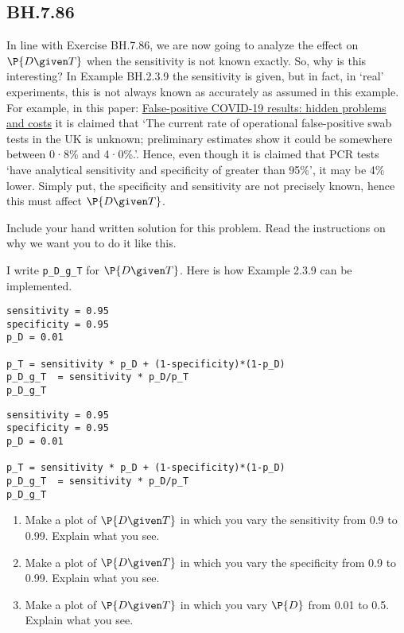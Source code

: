 \subsection{BH.7.86}

In line with Exercise BH.7.86, we are now going to analyze the effect on \(\P{D\given T}\) when the sensitivity is not known exactly.
So, why is this interesting?
In Example BH.2.3.9 the sensitivity is given, but in fact, in `real' experiments, this is not always known as accurately as assumed in this example.
For example, in this paper: \href{https://www.thelancet.com/journals/lanres/article/PIIS2213-2600(20)30453-7/fulltext}{False-positive COVID-19 results: hidden problems and costs} it is claimed that `The current rate of operational false-positive swab tests in the UK is unknown; preliminary estimates show it could be somewhere between 0·8\% and 4·0\%.'.
Hence, even though it is claimed that PCR tests `have analytical sensitivity and specificity of greater than 95\%', it may be 4\% lower.
Simply put, the specificity and sensitivity are not precisely known, hence this must affect \(\P{D\given T}\).




\begin{exercise}
Include your hand written solution for this problem. Read the instructions on why we want you to do it like this.
\end{exercise}


I write \texttt{p\_D\_g\_T} for \(\P{D\given T}\). Here is how  Example 2.3.9 can be implemented.

\begin{verbatim}
sensitivity = 0.95
specificity = 0.95
p_D = 0.01

p_T = sensitivity * p_D + (1-specificity)*(1-p_D)
p_D_g_T  = sensitivity * p_D/p_T
p_D_g_T
\end{verbatim}

\begin{verbatim}
sensitivity = 0.95
specificity = 0.95
p_D = 0.01

p_T = sensitivity * p_D + (1-specificity)*(1-p_D)
p_D_g_T  = sensitivity * p_D/p_T
p_D_g_T
\end{verbatim}


\begin{exercise}
\begin{enumerate}
\item Make a plot of \(\P{D\given T}\) in which you vary the sensitivity from 0.9 to 0.99. Explain what you see.
\item Make a plot of \(\P{D\given T}\) in which you vary the specificity from 0.9 to 0.99. Explain what you see.
\item Make a plot of \(\P{D\given T}\) in which you vary \(\P{D}\) from 0.01 to 0.5. Explain what you see.
\end{enumerate}
\end{exercise}
